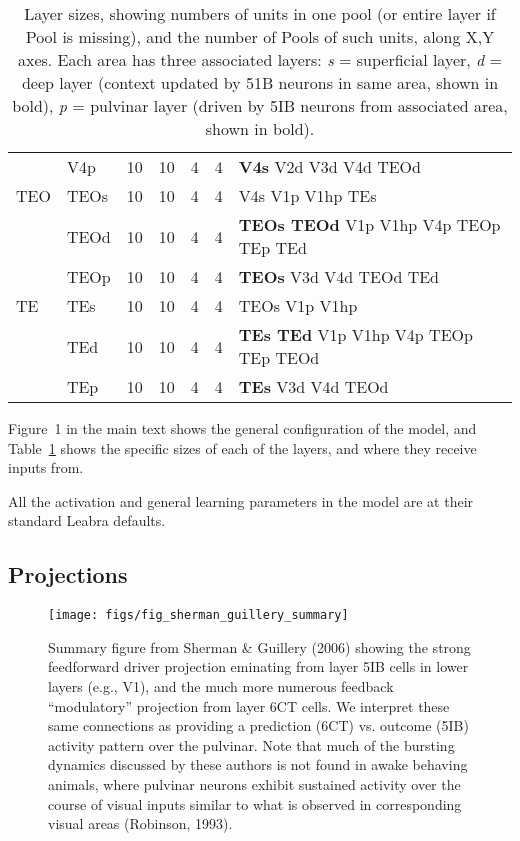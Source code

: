 \documentclass[12pt,twoside]{naturefigs}
\newif\myifpdf
\begin{document}
\begin{table}
\begin{tabular}{llrrlll}
   & V4p & 10 & 10 & 4 & 4 & {\bf V4s} V2d V3d V4d TEOd \\
TEO & TEOs & 10 & 10 & 4 & 4 & V4s V1p V1hp TEs\\
   & TEOd & 10 & 10 & 4 & 4 & {\bf TEOs TEOd} V1p V1hp V4p TEOp TEp TEd \\
   & TEOp & 10 & 10 & 4 & 4 & {\bf TEOs} V3d V4d TEOd TEd \\
TE & TEs & 10 & 10 & 4 & 4 & TEOs V1p V1hp \\
   & TEd & 10 & 10 & 4 & 4 & {\bf TEs TEd} V1p V1hp V4p TEOp TEp TEOd \\
   & TEp & 10 & 10 & 4 & 4 & {\bf TEs} V3d V4d TEOd \\
\hline
\end{tabular}
\caption{Layer sizes, showing numbers of units in one pool (or entire layer if Pool is missing), and the number of Pools of such units, along X,Y axes.  Each area has three associated layers: {\em s} = superficial layer, {\em d} = deep layer (context updated by 51B neurons in same area, shown in bold), {\em p} = pulvinar layer (driven by 5IB neurons from associated area, shown in bold).}
\label{tab.layer_sizes}
\end{table}

Figure~1 in the main text shows the general configuration of the model, and Table~\ref{tab.layer_sizes} shows the specific sizes of each of the layers, and where they receive inputs from. 

All the activation and general learning parameters in the model are at their standard Leabra defaults.

\subsection{Projections}

\begin{figure}
  \centering\texttt{[image: figs/fig\_sherman\_guillery\_summary]}
  \caption{Summary figure from Sherman \& Guillery (2006) showing the strong feedforward driver projection eminating from layer 5IB cells in lower layers (e.g., V1), and the much more numerous feedback ``modulatory'' projection from layer 6CT cells.  We interpret these same connections as providing a prediction (6CT) vs. outcome (5IB) activity pattern over the pulvinar.  Note that much of the bursting dynamics discussed by these authors is not found in awake behaving animals, where pulvinar neurons exhibit sustained activity over the course of visual inputs similar to what is observed in corresponding visual areas (Robinson, 1993).}
  \label{fig.sandg}
\end{figure}
\end{document}
